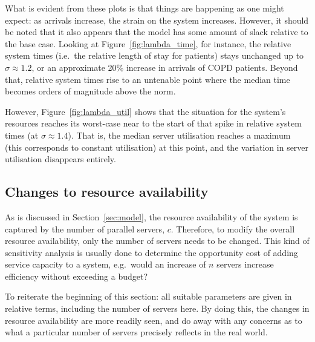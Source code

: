 What is evident from these plots is that things are happening as one might
expect: as arrivals increase, the strain on the system increases. However, it
should be noted that it also appears that the model has some amount of slack
relative to the base case. Looking at Figure~\ref{fig:lambda_time}, for
instance, the relative system times (i.e.\ the relative length of stay for
patients) stays unchanged up to \(\sigma \approx 1.2\), or an approximate 20\%
increase in arrivals of COPD patients. Beyond that, relative system times rise
to an untenable point where the median time becomes orders of magnitude above
the norm.

However, Figure~\ref{fig:lambda_util} shows that the situation for the system's
resources reaches its worst-case near to the start of that spike in relative
system times (at \(\sigma \approx 1.4\)). That is, the median server utilisation
reaches a maximum (this corresponds to constant utilisation) at this point, and
the variation in server utilisation disappears entirely.


\subsection{Changes to resource availability}\label{subsec:resources}

As is discussed in Section~\ref{sec:model}, the resource availability of the
system is captured by the number of parallel servers, \(c\). Therefore, to
modify the overall resource availability, only the number of servers needs to be
changed. This kind of sensitivity analysis is usually done to determine the
opportunity cost of adding service capacity to a system, e.g.\ would an increase
of \(n\) servers increase efficiency without exceeding a budget?

To reiterate the beginning of this section: all suitable parameters are given in
relative terms, including the number of servers here. By doing this, the
changes in resource availability are more readily seen, and do away with any
concerns as to what a particular number of servers precisely reflects in the
real world.

